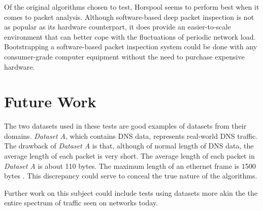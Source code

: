 \documentclass[9pt, technote]{IEEEtran}
\begin{document}
Of the original algorithms chosen to test, Horspool \citep{horspool1980} seems to perform best when it comes to packet analysis.
Although software-based deep packet inspection is not as popular as its hardware counterpart, it does provide an easier-to-scale environment that can better cope with the fluctuations of periodic network load. Bootstrapping a software-based packet inspection system could be done with any consumer-grade computer equipment without the need to purchase expensive hardware.

\section{Future Work}

The two datasets used in these tests are good examples of datasets from their domains. \textit{Dataset A}, which contains DNS data, represents real-world DNS traffic. The drawback of \textit{Dataset A} is that, although of normal length of DNS data, the average length of each packet is very short. The average length of each packet in \textit{Dataset A} is about 110 bytes. The maximum length of an ethernet frame is 1500 bytes \citep{law2012}. This discrepancy could serve to conceal the true nature of the algorithms.

Further work on this subject could include tests using datasets more akin the the entire spectrum of traffic seen on networks today. 



\end{document}
